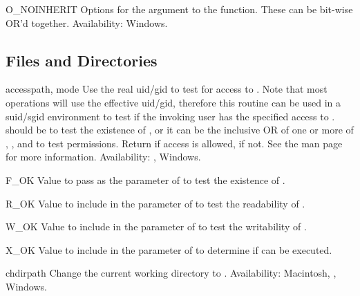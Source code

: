 \begin{datadesc}{O_NOINHERIT}
Options for the  argument to the  function.
These can be bit-wise OR'd together.
Availability: Windows.
\end{datadesc}

\subsection{Files and Directories \label{os-file-dir}}

\begin{funcdesc}{access}{path, mode}
Use the real uid/gid to test for access to .  Note that most
operations will use the effective uid/gid, therefore this routine can
be used in a suid/sgid environment to test if the invoking user has the
specified access to .   should be 
to test the existence of , or it can be the inclusive OR of
one or more of , , and  to
test permissions.  Return  if access is allowed,  if not.
See the \UNIX{} man page  for more information.
Availability: \UNIX, Windows.
\end{funcdesc}

\begin{datadesc}{F_OK}
  Value to pass as the  parameter of  to
  test the existence of .
\end{datadesc}

\begin{datadesc}{R_OK}
  Value to include in the  parameter of 
  to test the readability of .
\end{datadesc}

\begin{datadesc}{W_OK}
  Value to include in the  parameter of 
  to test the writability of .
\end{datadesc}

\begin{datadesc}{X_OK}
  Value to include in the  parameter of 
  to determine if  can be executed.
\end{datadesc}

\begin{funcdesc}{chdir}{path}
Change the current working directory to .
Availability: Macintosh, \UNIX, Windows.
\end{funcdesc}

